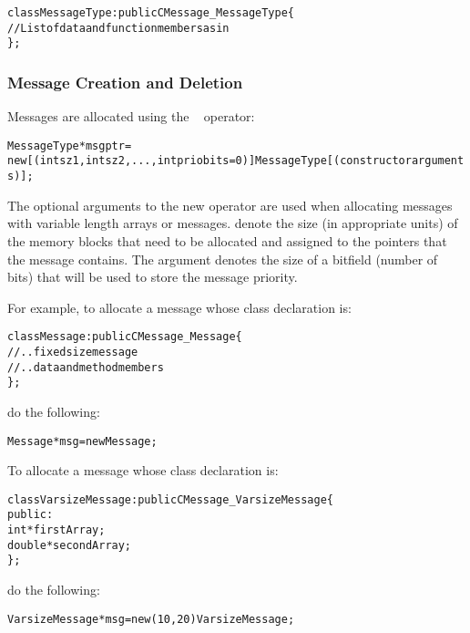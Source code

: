 \begin{alltt}
 class MessageType : public CMessage_MessageType \{
    // List of data and function members as in \CC
 \};
\end{alltt}


\subsubsection{Message Creation and Deletion}

\label{memory allocation}

Messages are allocated using the \CC\  operator:

\begin{alltt}
 MessageType *msgptr =
  new [(int sz1, int sz2, ... , int priobits=0)] MessageType[(constructor arguments)];
\end{alltt}

The optional arguments to the new operator are used when allocating messages
with variable length arrays or  messages. 
denote the size (in appropriate units) of the memory blocks that need to be
allocated and assigned to the pointers that the message contains. The
 argument denotes the size of a bitfield (number of bits) that
will be used to store the message priority.   

For example, to allocate a message whose class declaration is:

\begin{alltt}
class Message : public CMessage_Message \{
  // .. fixed size message
  // .. data and method members
\};
\end{alltt}

do the following:

\begin{alltt}
Message *msg = new Message;
\end{alltt}

To allocate a message whose class declaration is:

\begin{alltt}
class VarsizeMessage : public CMessage_VarsizeMessage \{
 public:
  int *firstArray;
  double *secondArray;
\};
\end{alltt}

do the following:

\begin{alltt}
VarsizeMessage *msg = new (10, 20) VarsizeMessage;
\end{alltt}

